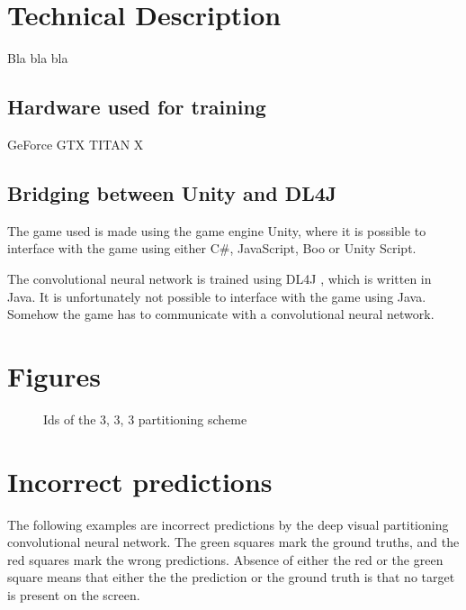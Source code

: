 
\section{Technical Description}
Bla bla bla

\subsection{Hardware used for training}
\label{sub:hardware}
GeForce GTX TITAN X

\subsection{Bridging between Unity and DL4J}
The game used is made using the game engine Unity, where it is possible to interface with the game using either C\#, JavaScript, Boo or Unity Script.

The convolutional neural network is trained using DL4J , which is written in Java.
It is unfortunately not possible to interface with the game using Java. Somehow the game has to communicate with a convolutional neural network.

\section{Figures}

\begin{figure}[H]
	\begin{scriptsize}
		\sffamily
		\def\svgwidth{\textwidth}
		
	\end{scriptsize}
	\caption{Ids of the 3, 3, 3 partitioning scheme}
	\label{fig:ids}
\end{figure}

\section{Incorrect predictions}
The following examples are incorrect predictions by the deep visual partitioning convolutional neural network. The green squares mark the ground truths, and the red squares mark the wrong predictions. Absence of either the red or the green square means that either the the prediction  or the ground truth is that no target is present on the screen.

\begin{figure}[H]
	\begin{center}
	\begin{scriptsize}
		\sffamily
		\def\svgwidth{0.95\textwidth}
		
	\end{scriptsize}
	\label{fig:ids}
	\end{center}
\end{figure}


\begin{figure}[H]
	\begin{center}
	\begin{scriptsize}
		\sffamily
		\def\svgwidth{0.95\textwidth}
		
	\end{scriptsize}
	\label{fig:ids}
	\end{center}
\end{figure}